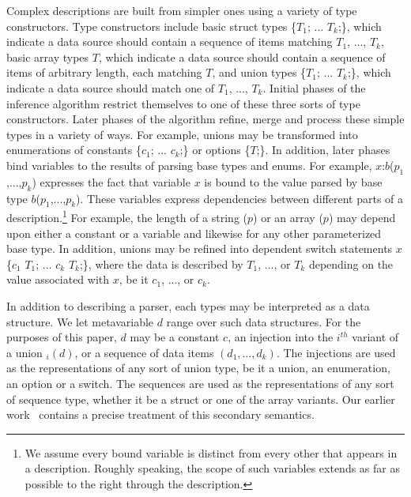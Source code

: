 Complex descriptions are built from simpler ones using a variety of
type constructors.  Type constructors include
basic struct types \{$T_1$; ... $T_k$;\}, which indicate a
data source
should contain a sequence of items matching $T_1$, ..., $T_k$,
basic array types  $T$, which indicate a data source should contain
a sequence of items of arbitrary length, each matching $T$,
and union types  \{$T_1$; ... $T_k$;\}, which indicate a
data source
should match one of $T_1$, ..., $T_k$.  Initial phases
of the inference algorithm restrict themselves to one of these three
sorts of type constructors.  Later phases of the algorithm
refine, merge and process these simple types in a variety of ways.
For example, unions may be transformed into 
enumerations of constants
 \{$c_1$; ... $c_k$;\}
or options  \{$T$;\}.  In
addition, later phases 
bind variables to the results of parsing 
base types and enums.  For example, $x$:$b$($p_1$,...,$p_k$) expresses the fact that
variable $x$ is bound to the value parsed by base type
$b$($p_1$,...,$p_k$).  These variables express dependencies between 
different parts
of a description.\footnote{
We assume every bound variable is distinct
from every other that appears in a description.  Roughly speaking,
the scope of such variables
extends as far as possible to the right through the description.
}  
For example, the length of a string ($p$)
or an array ($p$) may depend upon either a constant or
a variable and likewise for any other parameterized base type.  In
addition, unions may be refined into dependent switch statements
 $x$  \{$c_1$ \cd{=>} $T_1$; $\ldots$ $c_k$ \cd{=>} $T_k$;\}, where the
data is described by $T_1$, ..., or $T_k$ depending on the value
associated with $x$, be it $c_1$, ..., or $c_k$.

In addition to describing a parser, each 
\pads{} types may be interpreted as a data structure.
We let metavariable $d$ range over such 
data structures.  For the purposes of this paper, $d$
may be a constant $c$, an injection into the $i^{th}$
variant of a union $_i(d)$, or a sequence of data items
$(d_1,\ldots,d_k)$.  The injections are used as the representations of
any sort of union type, be it a union, an enumeration, an option or a switch.
The sequences are used as the representations of any sort of sequence
type, whether it be a struct or one of the array variants.  Our earlier
work~\cite{fisher+:popl06} contains a precise treatment of this 
secondary semantics.

